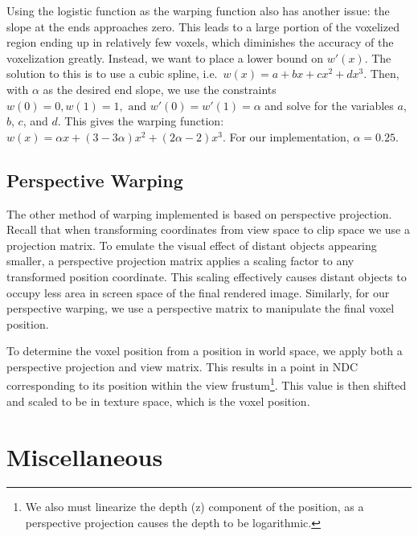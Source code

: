 Using the logistic function as the warping function also has another issue: the slope at the ends approaches zero. This leads to a large portion of the voxelized region ending up in relatively few voxels, which diminishes the accuracy of the voxelization greatly. %
Instead, we want to place a lower bound on $w'(x)$. The solution to this is to use a cubic spline, i.e.\ $w(x) = a + bx + cx^2 + dx^3$. Then, with $\alpha$ as the desired end slope, we use the constraints $w(0) = 0, w(1) = 1, \text{ and } w'(0) = w'(1) = \alpha$ and solve for the variables $a$, $b$, $c$, and $d$. This gives the warping function: $w(x) = \alpha x + (3 - 3 \alpha) x^2 + (2 \alpha - 2) x^3$. For our implementation, $\alpha = 0.25$.



\subsection{Perspective Warping}
The other method of warping implemented is based on perspective projection. Recall that when transforming coordinates from view space to clip space we use a projection matrix. To emulate the visual effect of distant objects appearing smaller, a perspective projection matrix applies a scaling factor to any transformed position coordinate. This scaling effectively causes distant objects to occupy less area in screen space of the final rendered image. Similarly, for our perspective warping, we use a perspective matrix to manipulate the final voxel position.

To determine the voxel position from a position in world space, we apply both a perspective projection and view matrix. This results in a point in NDC corresponding to its position within the view frustum\footnote{We also must linearize the depth (z) component of the position, as a perspective projection causes the depth to be logarithmic.}. This value is then shifted and scaled to be in texture space, which is the voxel position.

\section{Miscellaneous}

